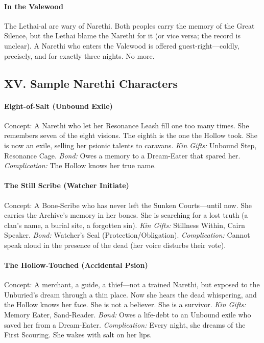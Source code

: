 \documentclass[11pt]{article}
\begin{document}
\paragraph{In the Valewood} The Lethai-al are wary of Narethi. Both peoples carry the memory of the Great Silence, but the Lethai blame the Narethi for it (or vice versa; the record is unclear). A Narethi who enters the Valewood is offered guest-right---coldly, precisely, and for exactly three nights. No more.

\subsection*{XV. Sample Narethi Characters}
\paragraph{Eight-of-Salt (Unbound Exile)}
Concept: A Narethi who let her Resonance Leash fill one too many times. She remembers seven of the eight visions. The eighth is the one the Hollow took. She is now an exile, selling her psionic talents to caravans. \textit{Kin Gifts:} Unbound Step, Resonance Cage. \textit{Bond:} Owes a memory to a Dream-Eater that spared her. \textit{Complication:} The Hollow knows her true name.

\paragraph{The Still Scribe (Watcher Initiate)}
Concept: A Bone-Scribe who has never left the Sunken Courts---until now. She carries the Archive's memory in her bones. She is searching for a lost truth (a clan's name, a burial site, a forgotten sin). \textit{Kin Gifts:} Stillness Within, Cairn Speaker. \textit{Bond:} Watcher's Seal (Protection/Obligation). \textit{Complication:} Cannot speak aloud in the presence of the dead (her voice disturbs their vote).

\paragraph{The Hollow-Touched (Accidental Psion)}
Concept: A merchant, a guide, a thief---not a trained Narethi, but exposed to the Unburied's dream through a thin place. Now she hears the dead whispering, and the Hollow knows her face. She is not a believer. She is a survivor. \textit{Kin Gifts:} Memory Eater, Sand-Reader. \textit{Bond:} Owes a life-debt to an Unbound exile who saved her from a Dream-Eater. \textit{Complication:} Every night, she dreams of the First Scouring. She wakes with salt on her lips.


\end{document}
